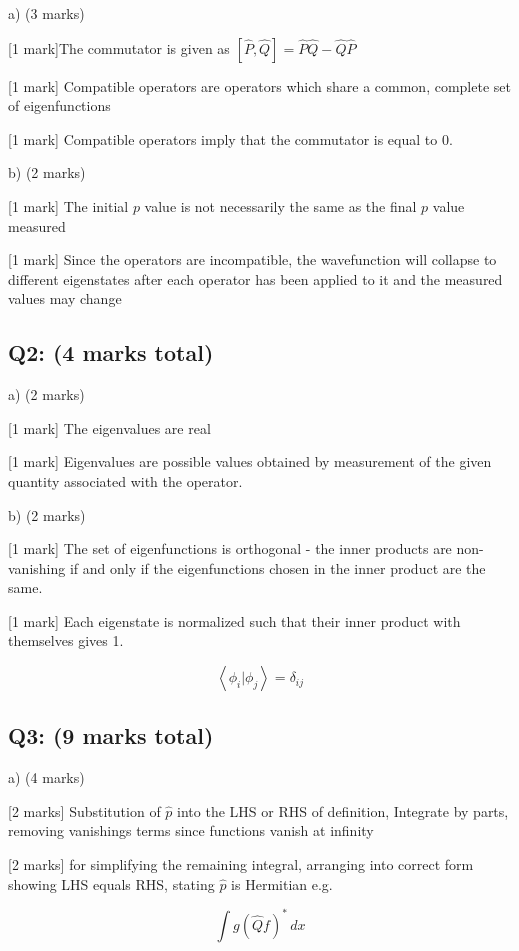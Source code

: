 \documentclass[a4paper,11pt]{article}
\begin{document}
a) (3 marks)

[1 mark]The commutator is given as  \( \left[\hat{P}, \hat{Q} \right] = \hat{P}\hat{Q} - \hat{Q}\hat{P} \)

[1 mark] Compatible operators are operators which share a common, complete set of eigenfunctions

[1 mark] Compatible operators imply that the commutator is equal to 0.

b) (2 marks)

[1 mark] The initial \( p \) value is not necessarily the same as the final \( p \) value measured

[1 mark] Since the operators are incompatible, the wavefunction will collapse to different eigenstates after each operator has been applied to it and the measured values may change

\subsection*{Q2: (4 marks total)}

a) (2 marks)

[1 mark] The eigenvalues are real 

[1 mark] Eigenvalues are possible values obtained by measurement of the given quantity associated with the operator. 

b) (2 marks)

[1 mark] The set of eigenfunctions is orthogonal - the inner products are non-vanishing if and only if the eigenfunctions chosen in the inner product are the same. 

[1 mark] Each eigenstate is normalized such that their inner product with themselves gives 1. 

\[ \left< \phi_i | \phi_j \right> = \delta_{ij} \]

\subsection*{Q3: (9 marks total)}

a) (4 marks)

[2 marks] Substitution of \( \hat{p} \) into the LHS or RHS of definition, Integrate by parts, removing vanishings terms since functions vanish at infinity 

[2 marks] for simplifying the remaining integral, arranging into correct form showing LHS equals RHS, stating  \( \hat{p} \) is Hermitian e.g. 

\[ \int g (\hat{Q}f)^{*} \, dx \]
\end{document}
